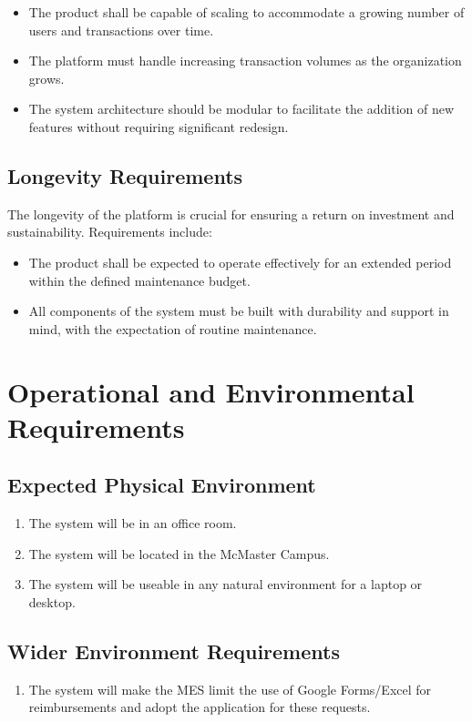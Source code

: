 \documentclass[12pt]{article}
\begin{document}
\begin{itemize}
    \item The product shall be capable of scaling to accommodate a growing number of users and transactions over time.
    \item The platform must handle increasing transaction volumes as the organization grows.
    \item The system architecture should be modular to facilitate the addition of new features without requiring significant redesign.
\end{itemize}

\subsection{Longevity Requirements}
The longevity of the platform is crucial for ensuring a return on investment and sustainability. Requirements include:

\begin{itemize}
    \item The product shall be expected to operate effectively for an extended period within the defined maintenance budget.
    \item All components of the system must be built with durability and support in mind, with the expectation of routine maintenance.
\end{itemize}

\section{Operational and Environmental Requirements}
\subsection{Expected Physical Environment}
\begin{enumerate}
  \item The system will be in an office room.
  \item The system will be located in the McMaster Campus. 
  \item The system will be useable in any natural environment for a laptop or desktop. 
\end{enumerate}
\subsection{Wider Environment Requirements}
\begin{enumerate}
  \item The system will make the MES limit the use of Google Forms/Excel for reimbursements and adopt the application for these requests.
\end{enumerate}
\end{document}

